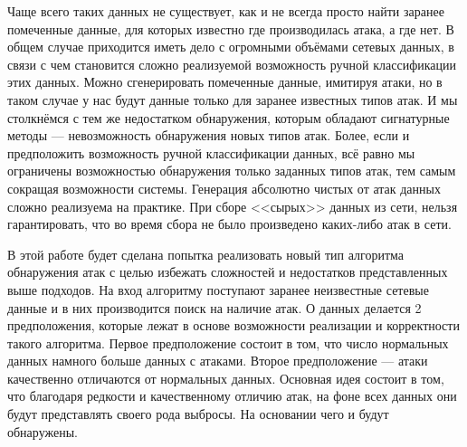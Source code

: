 Чаще всего таких данных не существует, как и не всегда просто найти заранее помеченные данные, для которых известно где производилась атака, а где нет. В общем случае приходится иметь дело с огромными объёмами сетевых данных, в связи с чем становится сложно реализуемой возможность ручной классификации этих данных. Можно сгенерировать помеченные данные, имитируя атаки, но в таком случае у нас будут данные только для заранее известных типов атак. И мы столкнёмся с тем же недостатком обнаружения, которым обладают сигнатурные методы --- невозможность обнаружения новых типов атак. Более, если и предположить возможность ручной классификации данных, всё равно мы ограничены возможностью обнаружения только заданных типов атак, тем самым сокращая возможности системы. Генерация абсолютно чистых от атак данных сложно реализуема на практике. При сборе <<сырых>> данных из сети, нельзя гарантировать, что во время сбора не было произведено каких-либо атак в сети.

В этой работе будет сделана попытка реализовать новый тип алгоритма обнаружения атак с целью избежать сложностей и недостатков представленных выше подходов. На вход алгоритму поступают заранее неизвестные сетевые данные и в них производится поиск на наличие атак. О данных делается 2 предположения, которые лежат в основе возможности реализации и корректности такого алгоритма. Первое предположение состоит в том, что число нормальных данных намного больше данных с атаками. Второе предположение --- атаки качественно отличаются от нормальных данных. Основная идея состоит в том, что благодаря редкости и качественному отличию атак, на фоне всех данных они будут представлять своего рода выбросы. На основании чего и будут обнаружены. 